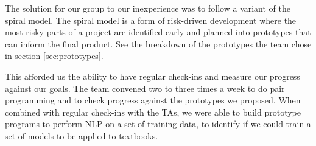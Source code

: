 
The solution for our group to our inexperience was to follow a variant
of the spiral model.
The spiral model is a form of risk-driven development where the most
risky parts of a project are identified early and planned into
prototypes that can inform the final product.
See the breakdown of the prototypes the team chose in section
\ref{sec:prototypes}.

This afforded us the ability to have regular check-ins and measure our
progress against our goals.
The team convened two to three times a week to do pair programming and
to check progress against the prototypes we proposed.
When combined with regular check-ins with the TAs, we were able to
build prototype programs to perform NLP on a set of training data, to
identify if we could train a set of models to be applied to
textbooks. 

